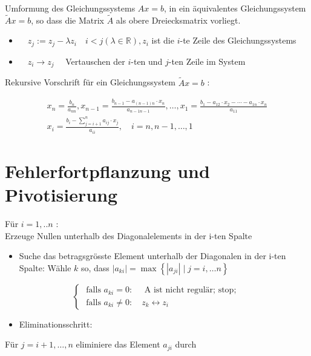 \documentclass[10pt]{article}
\begin{document}
Umformung des Gleichungssystems $A x=b$, in ein äquivalentes Gleichungssystem $\tilde{A} x=b$, so dass die Matrix $\tilde{A}$ als obere Dreiecksmatrix vorliegt.

\begin{itemize}
  \item $\quad z_{j}:=z_{j}-\lambda z_{i} \quad i<j(\lambda \in \mathbb{R}), z_{i}$ ist die $i$-te Zeile des Gleichungssystems
  \item $\quad z_{i} \rightarrow z_{j} \quad$ Vertauschen der $i$-ten und $j$-ten Zeile im System
\end{itemize}

Rekursive Vorschrift für ein Gleichungssystem $\tilde{A} x=b$ :

$$
\begin{gathered}
x_{n}=\frac{b_{n}}{a_{n n}}, x_{n-1}=\frac{b_{n-1}-a_{(n-1) n} \cdot x_{n}}{a_{n-1 n-1}}, \ldots, x_{1}=\frac{b_{1}-a_{12} \cdot x_{2}-\cdots-a_{1 n} \cdot x_{n}}{a_{11}} \\
x_{i}=\frac{b_{i}-\sum_{j=i+1}^{n} a_{i j} \cdot x_{j}}{a_{i i}}, \quad i=n, n-1, \ldots, 1
\end{gathered}
$$

\section*{Fehlerfortpflanzung und Pivotisierung}
Für $i=1, . . n$ :\\
Erzeuge Nullen unterhalb des Diagonalelements in der i-ten Spalte

\begin{itemize}
  \item Suche das betragsgrösste Element unterhalb der Diagonalen in der i-ten Spalte: Wähle $k$ so, dass $\left|a_{k i}\right|=\max \left\{\left|a_{j i}\right| \mid j=i, \ldots n\right\}$
\end{itemize}

$$
\left\{\begin{array}{l}
\text { falls } a_{k i}=0: \quad \text { A ist nicht regulär; stop; } \\
\text { falls } a_{k i} \neq 0: \quad z_{k} \leftrightarrow z_{i}
\end{array}\right.
$$

\begin{itemize}
  \item Eliminationsschritt:
\end{itemize}

Für $j=i+1, \ldots, n$ eliminiere das Element $a_{j i}$ durch
\end{document}
